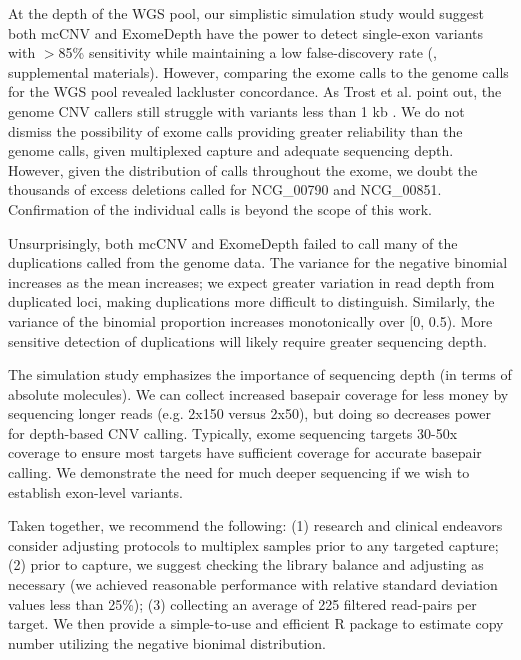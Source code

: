 \documentclass{article}\usepackage[]{graphicx}\usepackage[]{color}
\begin{document}
At the depth of the WGS pool, our simplistic simulation study would suggest both mcCNV and ExomeDepth have the power to detect single-exon variants with $>$85\% sensitivity while maintaining a low false-discovery rate (, supplemental materials).
However, comparing the exome calls to the genome calls for the WGS pool revealed lackluster concordance.
As Trost et al. point out, the genome CNV callers still struggle with variants less than 1 kb \cite{trost:2018aa}.
We do not dismiss the possibility of exome calls providing greater reliability than the genome calls, given multiplexed capture and adequate sequencing depth.
However, given the distribution of calls throughout the exome, we doubt the thousands of excess deletions called for NCG\_00790 and NCG\_00851.
Confirmation of the individual calls is beyond the scope of this work.

Unsurprisingly, both mcCNV and ExomeDepth failed to call many of the duplications called from the genome data.
The variance for the negative binomial increases as the mean increases; we expect greater variation in read depth from duplicated loci, making duplications more difficult to distinguish.
Similarly, the variance of the binomial proportion increases monotonically over [0, 0.5).
More sensitive detection of duplications will likely require greater sequencing depth.

The simulation study emphasizes the importance of sequencing depth (in terms of absolute molecules).
We can collect increased basepair coverage for less money by sequencing longer reads (e.g. 2x150 versus 2x50), but doing so decreases power for depth-based CNV calling.
Typically, exome sequencing targets 30-50x coverage to ensure most targets have sufficient coverage for accurate basepair calling.
We demonstrate the need for much deeper sequencing if we wish to establish exon-level variants.

Taken together, we recommend the following:
(1) research and clinical endeavors consider adjusting protocols to multiplex samples prior to any targeted capture;
(2) prior to capture, we suggest checking the library balance and adjusting as necessary (we achieved reasonable performance with relative standard deviation values less than 25\%);
(3) collecting an average of 225 filtered read-pairs per target.
We then provide a simple-to-use and efficient R package to estimate copy number utilizing the negative bionimal distribution.
\end{document}

